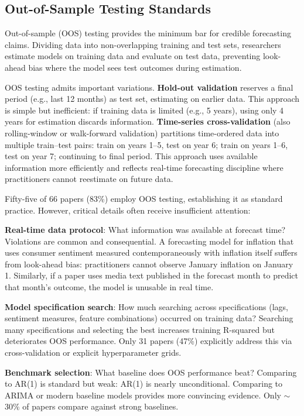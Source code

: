 \documentclass[11pt]{article}
\begin{document}
\subsection{Out-of-Sample Testing Standards}

Out-of-sample (OOS) testing provides the minimum bar for credible forecasting claims. Dividing data into non-overlapping training and test sets, researchers estimate models on training data and evaluate on test data, preventing look-ahead bias where the model sees test outcomes during estimation.

OOS testing admits important variations. \textbf{Hold-out validation} reserves a final period (e.g., last 12 months) as test set, estimating on earlier data. This approach is simple but inefficient: if training data is limited (e.g., 5 years), using only 4 years for estimation discards information. \textbf{Time-series cross-validation} (also rolling-window or walk-forward validation) partitions time-ordered data into multiple train--test pairs: train on years 1--5, test on year 6; train on years 1--6, test on year 7; continuing to final period. This approach uses available information more efficiently and reflects real-time forecasting discipline where practitioners cannot reestimate on future data.

Fifty-five of 66 papers (83\%) employ OOS testing, establishing it as standard practice. However, critical details often receive insufficient attention:

\textbf{Real-time data protocol}: What information was available at forecast time? Violations are common and consequential. A forecasting model for inflation that uses consumer sentiment measured contemporaneously with inflation itself suffers from look-ahead bias: practitioners cannot observe January inflation on January 1. Similarly, if a paper uses media text published in the forecast month to predict that month's outcome, the model is unusable in real time.

\textbf{Model specification search}: How much searching across specifications (lags, sentiment measures, feature combinations) occurred on training data? Searching many specifications and selecting the best increases training R-squared but deteriorates OOS performance. Only 31 papers (47\%) explicitly address this via cross-validation or explicit hyperparameter grids.

\textbf{Benchmark selection}: What baseline does OOS performance beat? Comparing to AR(1) is standard but weak: AR(1) is nearly unconditional. Comparing to ARIMA or modern baseline models provides more convincing evidence. Only $\sim$30\% of papers compare against strong baselines.
\end{document}
